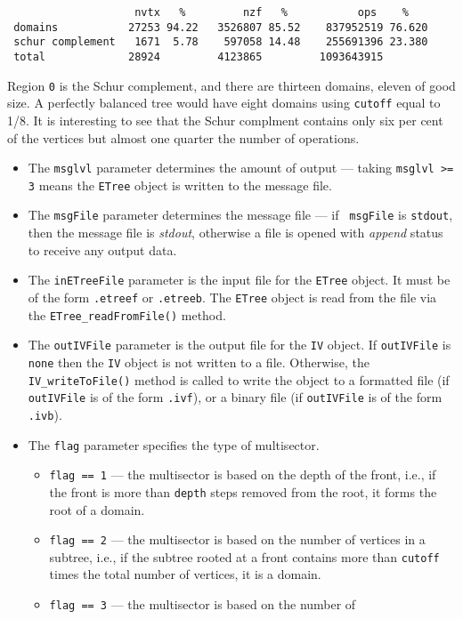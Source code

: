 \begin{enumerate}
\begin{verbatim}
                    nvtx   %         nzf   %           ops    %
 domains           27253 94.22   3526807 85.52    837952519 76.620
 schur complement   1671  5.78    597058 14.48    255691396 23.380
 total             28924         4123865         1093643915      
\end{verbatim}
Region {\tt 0} is the Schur complement, and there are thirteen
domains, eleven of good size.
A perfectly balanced tree would have eight domains using {\tt cutoff}
equal to 1/8.
It is interesting to see that the Schur complment contains only six
per cent of the vertices but almost one quarter the number of
operations.
\par
\begin{itemize}
\item
The {\tt msglvl} parameter determines the amount of output ---
taking {\tt msglvl >= 3} means the {\tt ETree} object is written
to the message file.
\item
The {\tt msgFile} parameter determines the message file --- if {\tt
msgFile} is {\tt stdout}, then the message file is {\it stdout},
otherwise a file is opened with {\it append} status to receive any
output data.
\item
The {\tt inETreeFile} parameter is the input file for the {\tt ETree}
object. It must be of the form {\tt *.etreef} or {\tt *.etreeb}.
The {\tt ETree} object is read from the file via the
{\tt ETree\_readFromFile()} method.
\item
The {\tt outIVFile} parameter is the output file for the {\tt IV}
object. 
If {\tt outIVFile} is {\tt none} then the {\tt IV} object is not
written to a file. 
Otherwise, the {\tt IV\_writeToFile()} method is called to write
the object to a formatted file (if {\tt outIVFile} 
is of the form {\tt *.ivf}), or a binary file 
(if {\tt outIVFile} is of the form {\tt *.ivb}).
\item
The {\tt flag} parameter specifies the type of multisector.
\begin{itemize}
\item
{\tt flag == 1} --- the multisector is based on the depth of the
front, i.e., if the front is more than {\tt depth} steps removed
from the root, it forms the root of a domain.
\item
{\tt flag == 2} --- the multisector is based on the number of
vertices in a subtree, i.e., if the subtree rooted at a front
contains more than {\tt cutoff} times the total number of vertices,
it is a domain.
\item
{\tt flag == 3} --- the multisector is based on the number of

\end{itemize}
\end{itemize}
\end{enumerate}
